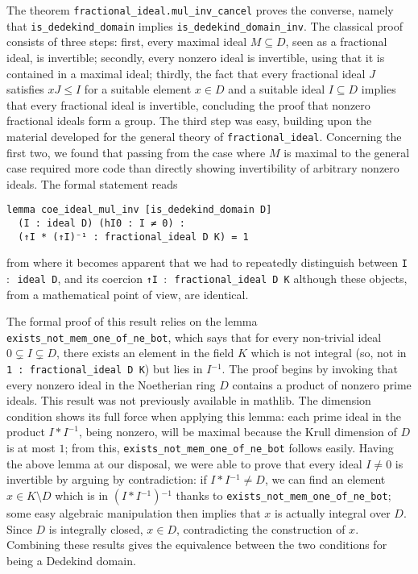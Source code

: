 \documentclass[sn-mathphys]{sn-jnl}%
\newcommand{\inv}{\ensuremath{{}^{-1}}}
\newcommand{\lean}[1]{\texttt{#1}\xspace}
\newcommand{\mathlib}{\textsf{mathlib}\xspace}
\begin{document}
The theorem \lean{fractional\_ideal.mul\_inv\_cancel} proves the converse, namely that \lean{is\_dedekind\_domain} implies \lean{is\_dedekind\_domain\_inv}. The classical proof consists of three steps: first, every maximal ideal $M\subseteq D$, seen as a fractional ideal, is invertible;
secondly, every nonzero ideal is invertible, using that it is contained in a maximal ideal;
thirdly, the fact that every fractional ideal $J$ satisfies $xJ\leq I$ for a suitable element $x\in D$ and a suitable ideal $I\subseteq D$ implies that every fractional ideal is invertible, concluding the proof that nonzero fractional ideals form a group.
The third step was easy, building upon the material developed for the general theory of \lean{fractional\_ideal}. Concerning the first two, we found that passing from the case where $M$ is maximal to the general case required more code than directly showing invertibility of arbitrary nonzero ideals. The formal statement reads
\begin{lstlisting}
lemma coe_ideal_mul_inv [is_dedekind_domain D] 
  (I : ideal D) (hI0 : I ≠ 0) :
  (↑I * (↑I)⁻¹ : fractional_ideal D K) = 1
\end{lstlisting}
from where it becomes apparent that we had to repeatedly distinguish between \lean{I $:$ ideal D}, and its coercion \lean{↑I $:$ fractional\_ideal D K} although these objects, from a mathematical point of view, are identical.

The formal proof of this result relies on the lemma \lean{exists\_not\_mem\_one\-\_of\-\_ne\-\_bot}, which says that for every non-trivial ideal $0\subsetneq I\subsetneq D$, there exists an element in the field $K$ which is not integral (so, not in \lean{1 : fractional\_ideal D K}) but lies in $I\inv$. The proof begins by invoking that every nonzero ideal in the Noetherian ring $D$ contains a product of nonzero prime ideals. This result was not previously available in \mathlib.
The dimension condition shows its full force when applying this lemma:
each prime ideal in the product $I\ast I^{-1}$, being nonzero, will be maximal because the Krull dimension of $D$ is at most $1$; from this, \lean{exists\_not\_mem\_one\_of\_ne\_bot} follows easily. Having the above lemma at our disposal,
we were able to prove that every ideal $I\ne 0$ is invertible by arguing by contradiction: if $I\ast I\inv \ne D$, we can find an element $x\in K\setminus D$ which is in $(I\ast I\inv)\inv$ thanks to \lean{exists\_not\_mem\_one\_of\_ne\_bot}; some easy algebraic manipulation then implies that $x$ is actually integral over $D$. Since $D$ is integrally closed, $x \in D$, contradicting the construction of $x$. Combining these results gives the equivalence between the two conditions for being a Dedekind domain.
\end{document}
